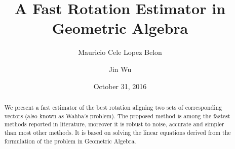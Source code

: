 \documentclass{birkjour}
\numberwithin{equation}{section}
\begin{document}
%
%
%
%
%
%
%
%
%


\title[A Fast Rotation Estimator in Geometric Algebra]
 {A Fast Rotation Estimator in Geometric Algebra}

\author[Mauricio Cele Lopez Belon]{Mauricio Cele Lopez Belon}
\address{Buenos Aires, Argentina}

\author[Jin Wu]{Jin Wu}
\address{University of Electronic Science and Technology of China, Chengdu, China}



\date{October 31, 2016}

\begin{abstract}

We present a fast estimator of the best rotation aligning two sets of corresponding vectors (also known as Wahba's problem). The proposed method is among the fastest methods reported in literature, moreover it is robust to noise, accurate and simpler than most other methods. It is based on solving the linear equations derived from the formulation of the problem in Geometric Algebra.

\end{abstract}

\maketitle
\end{document}
